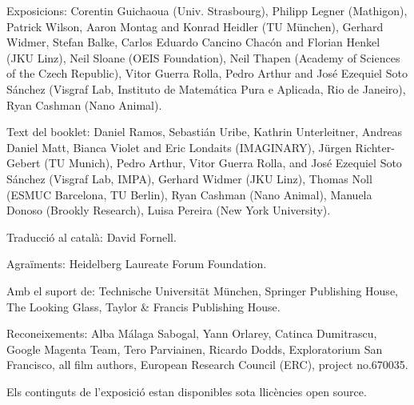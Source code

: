 Exposicions:
Corentin Guichaoua (Univ. Strasbourg), Philipp Legner (Mathigon), Patrick Wilson, Aaron Montag and Konrad Heidler (TU
 München), Gerhard Widmer, Stefan Balke, Carlos Eduardo Cancino Chacón and Florian Henkel (JKU Linz), Neil Sloane (OEIS Foundation), Neil Thapen (Academy of Sciences of the Czech Republic), Vitor Guerra Rolla, Pedro Arthur and José Ezequiel Soto Sánchez (Visgraf Lab, Instituto de Matemática Pura e Aplicada, Rio de Janeiro), Ryan Cashman (Nano Animal).

Text del booklet:
Daniel Ramos, Sebastián Uribe, Kathrin Unterleitner, Andreas Daniel Matt, Bianca Violet and Eric Londaits (IMAGINARY), Jürgen Richter-Gebert (TU Munich), Pedro Arthur, Vitor Guerra Rolla, and José Ezequiel Soto Sánchez (Visgraf Lab, IMPA), Gerhard Widmer (JKU Linz), Thomas Noll (ESMUC Bar\-ce\-lo\-na, TU Berlin), Ryan Cashman (Nano Animal), Manuela Donoso (Brookly Research), Luisa Pereira (New York University).

Traducció al català: David Fornell.

Agraïments:
Heidelberg Laureate Forum Foundation.

Amb el suport de:
Technische Universität München, Springer Publishing House, The Looking Glass, Taylor \& Francis Publishing House.

Reconeixements: 
Alba Málaga Sabogal, Yann Orlarey, Catinca Dumitrascu, Google Magenta Team, Tero Parviainen, Ricardo Dodds, Exploratorium San Francisco, all film authors, European Research Council (ERC), project no.670035.

Els continguts de l'exposició estan disponibles sota llicències open source.

